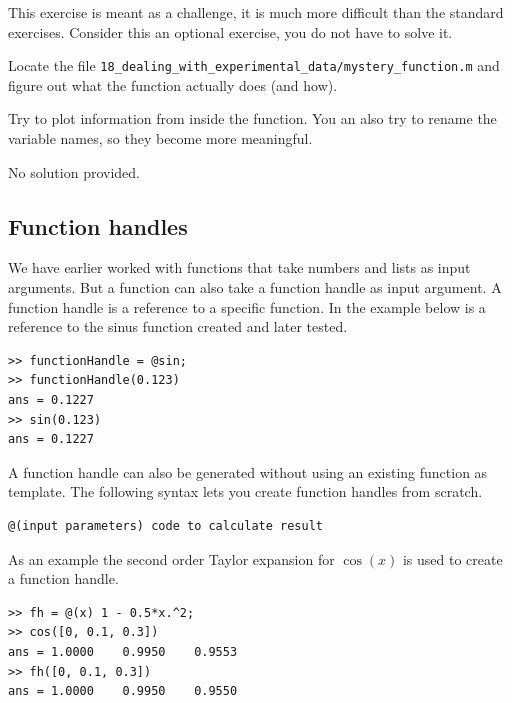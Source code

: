 \begin{ex}
\begin{tcolorbox}
This exercise is meant as a challenge, it is much more difficult 
than the standard exercises.
Consider this an optional exercise, you do not have to 
solve it.
\end{tcolorbox}
Locate the file \verb!18_dealing_with_experimental_data/mystery_function.m! and figure out what the function actually does 
(and how).
\begin{hint}
Try to plot information from inside the function.
You an also try to rename the variable names, so they 
become more meaningful.
\end{hint}
\begin{sol}
No solution provided.
\end{sol}
\end{ex}



\subsection{Function handles}

We have earlier worked with functions that take numbers and lists 
as input arguments.
But a function can also take a function handle as input argument.
A function handle is a reference to a specific function. 
In the example below is a reference to the sinus function created 
and later tested.
%
\begin{lstlisting}
>> functionHandle = @sin;
>> functionHandle(0.123)
ans = 0.1227
>> sin(0.123)
ans = 0.1227
\end{lstlisting}
%
A function handle can also be generated without using an existing function as template.
The following syntax lets you create function handles from scratch.
%
\begin{lstlisting}
@(input parameters) code to calculate result
\end{lstlisting}
%
As an example the second order Taylor expansion for $\cos(x)$ 
is used to create a function handle.
\begin{lstlisting}
>> fh = @(x) 1 - 0.5*x.^2;
>> cos([0, 0.1, 0.3])
ans = 1.0000    0.9950    0.9553
>> fh([0, 0.1, 0.3])
ans = 1.0000    0.9950    0.9550
\end{lstlisting}

